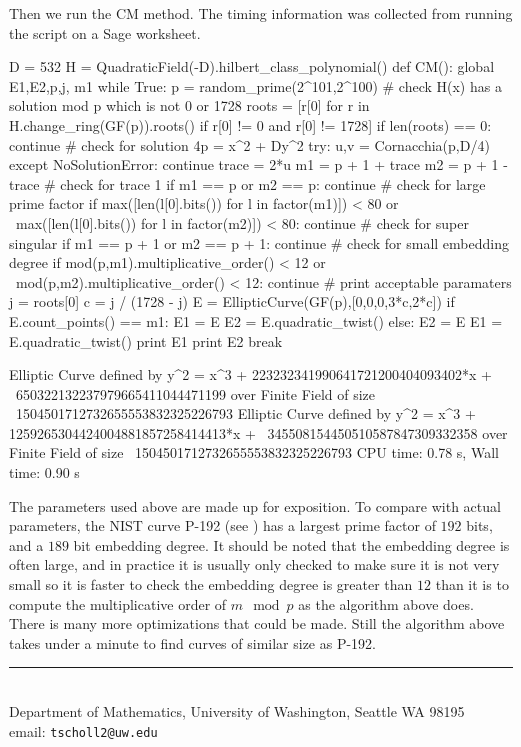 \documentclass[11pt]{article}
\makeatletter
\newcommand{\myauthor}{Travis Scholl}
\newcommand{\myemail}{tscholl2@uw.edu}
\makeatother
\begin{document}
Then we run the CM method. The timing information was collected from running the script on a Sage worksheet.
\begin{sagecode}
\begin{sagecell}
D = 532
H = QuadraticField(-D).hilbert_class_polynomial()
def CM():
    global E1,E2,p,j, m1
    while True:
        p = random_prime(2^101,2^100)
        # check H(x) has a solution mod p which is not 0 or 1728
        roots = [r[0] for r in H.change_ring(GF(p)).roots() if r[0] != 0 and r[0] != 1728]
        if len(roots) == 0:
            continue
        # check for solution 4p = x^2 + Dy^2
        try:
            u,v = Cornacchia(p,D/4)
        except NoSolutionError:
            continue
        trace = 2*u
        m1 = p + 1 + trace
        m2 = p + 1 - trace
        # check for trace 1
        if m1 == p or m2 == p:
            continue
        # check for large prime factor
        if max([len(l[0].bits()) for l in factor(m1)]) < 80 or \
            max([len(l[0].bits()) for l in factor(m2)]) < 80:
            continue
        # check for super singular
        if m1 == p + 1 or m2 == p + 1:
            continue
        # check for small embedding degree
        if mod(p,m1).multiplicative_order() < 12 or \
            mod(p,m2).multiplicative_order() < 12:
            continue
        # print acceptable paramaters
        j = roots[0]
        c = j / (1728 - j)
        E = EllipticCurve(GF(p),[0,0,0,3*c,2*c])
        if E.count_points() == m1:
            E1 = E
            E2 = E.quadratic_twist()
        else:
            E2 = E
            E1 = E.quadratic_twist()
        print E1
        print E2
        break
\end{sagecell}
\begin{sageout}
Elliptic Curve defined by y^2 = x^3 + 223232341990641721200404093402*x + \ 
650322132237979665411044471199 over Finite Field of size \
1504501712732655553832325226793
Elliptic Curve defined by y^2 = x^3 + 1259265304424004881857258414413*x + \ 
345508154450510587847309332358 over Finite Field of size \ 
1504501712732655553832325226793
CPU time: 0.78 s, Wall time: 0.90 s
\end{sageout}
\end{sagecode}

\begin{rem}
	The parameters used above are made up for exposition. To compare with actual parameters, the NIST curve P-192 (see \cite[D.1.2.1, Pg.~90]{fips2013}) has a largest prime factor of $192$ bits, and a $189$ bit embedding degree. It should be noted that the embedding degree is often large, and in practice it is usually only checked to make sure it is not very small so it is faster to check the embedding degree is greater than $12$ than it is to compute the multiplicative order of $m\mod{p}$ as the algorithm above does. There is many more optimizations that could be made. Still the algorithm above takes under a minute to find curves of similar size as P-192.
\end{rem}





\begin{center}
\noindent\rule{4cm}{.5pt}
\vspace{.25cm}

\noindent {\sc \small \myauthor}\\
{\small Department of Mathematics, University of Washington, Seattle WA 98195} \\
email: {\tt \myemail}
\end{center}
\end{document}
